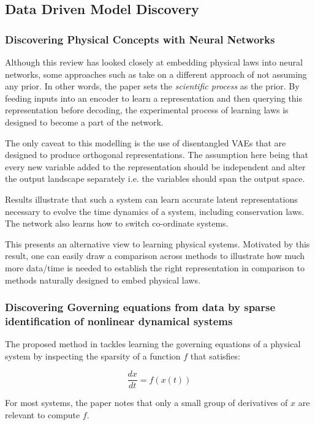 \documentclass{article}
\begin{document}
\subsection{Data Driven Model Discovery}


\subsubsection{Discovering Physical Concepts with Neural Networks}

Although this review has looked closely at embedding physical laws into neural networks, some approaches such as \cite{iten_discovering_2020} take on a different approach of not assuming any prior. In other words, the paper sets the \textit{scientific process} as the prior. By feeding inputs into an encoder to learn a representation and then querying this representation before decoding, the experimental process of learning laws is designed to become a part of the network.

The only caveat to this modelling is the use of disentangled VAEs that are designed to produce orthogonal representations. The assumption here being that every new variable added to the representation should be independent and alter the output landscape separately i.e. the variables should span the output space.

Results illustrate that such a system can learn accurate latent representations necessary to evolve the time dynamics of a system, including conservation laws. The network also learns how to switch co-ordinate systems.

This presents an alternative view to learning physical systems. Motivated by this result, one can easily draw a comparison across methods to illustrate how much more data/time is needed to establish the right representation in comparison to methods naturally designed to embed physical laws. 

\subsubsection{Discovering Governing equations from data by sparse identification of nonlinear dynamical systems}

The proposed method in \cite{brunton_discovering_2016} tackles learning the governing equations of a physical system by inspecting the sparsity of a function $f$ that satisfies:
 
 $$ \frac{dx}{dt} = f(x(t)) $$
 
For most systems, the paper notes that only a small group of derivatives of $x$ are relevant to compute $f$. 
 
\end{document}
